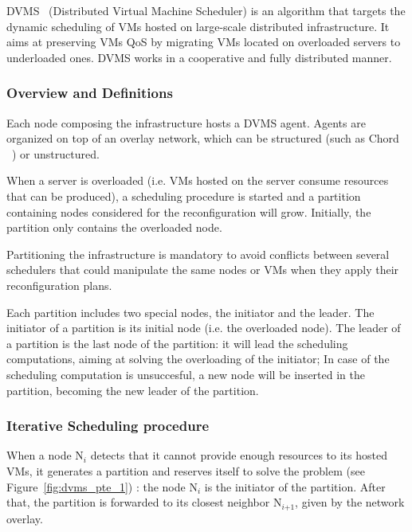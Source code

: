 DVMS~\cite{quesnel:cpe2012} (Distributed Virtual Machine
Scheduler) is an algorithm that targets the dynamic scheduling of VMs hosted on
large-scale distributed infrastructure. It aims at preserving VMs QoS by 
migrating VMs located on overloaded servers to underloaded ones. DVMS works in 
a cooperative and fully distributed manner.

\subsubsection{Overview and Definitions}

Each node composing the infrastructure hosts a DVMS agent. Agents
are organized on top of an overlay network, which can be structured (such as 
Chord ~\cite{stoica:2001:sigcomm01}) or unstructured.

When a server is overloaded (i.e. VMs hosted on the server consume resources 
that can be produced), a scheduling procedure is started and a partition 
containing nodes considered for the reconfiguration will grow. Initially, the 
partition only contains the overloaded node.

Partitioning the infrastructure is mandatory to avoid conflicts between several
schedulers that could manipulate the same nodes or VMs when they apply their
reconfiguration plans.

Each partition includes two special nodes, the initiator and the leader.
The initiator of a partition is its initial node (i.e. the overloaded node).
The leader of a partition is the last node of the partition: it will lead the 
scheduling computations, aiming at solving the overloading of the initiator; 
In case of the scheduling computation is unsuccesful, a new node will be 
inserted in the partition, becoming the new leader of the partition.


\subsubsection{Iterative Scheduling procedure}

When a node N\(_{\textit{i}}\) detects that it cannot provide enough resources 
to its hosted VMs, it generates a partition and reserves itself to solve the 
problem (see Figure~\ref{fig:dvms_pte_1}) : the node N\(_{\textit{i}}\) is the
initiator of the partition. After that, the partition is forwarded to its 
closest neighbor N\(_{\textit{i+1}}\), given by the network overlay.

